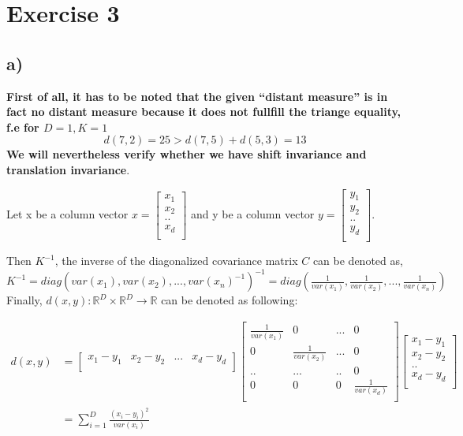 \section*{Exercise 3} %
\label{sec:exercise_3}

\subsection*{a)} %
\label{sub:a}

\textbf{First of all, it has to be noted that the given ``distant measure'' is in fact no distant measure because 
it does not fullfill the triange equality, f.e for $D=1, K=1$
\[
d(7,2) = 25 > d(7,5) + d(5,3) = 13
\]
We will nevertheless verify whether we have shift invariance and translation invariance}.

Let x be a column vector
$x = \begin{bmatrix}
x_{1}\\ 
x_{2}\\ 
..\\ 
x_{d} \\ 
\end{bmatrix}$
and y be a column vector
$y = \begin{bmatrix}
y_{1}\\ 
y_{2}\\ 
..\\ 
y_{d} \\ 
\end{bmatrix}$.

Then $K^{-1}$, the inverse of the diagonalized covariance matrix $C$ can be denoted as, 
$K^{-1}= diag(var(x_{1}), var(x_{2}), ..., var(x_{n})^{-1})^{-1} = diag(\frac{1}{var(x_{1})}, \frac{1}{var(x_{2})}, ..., \frac{1}{var(x_{n})})$ \\

Finally, $d(x,y): \mathbb{R}^D \times \mathbb{R}^D \to \mathbb{R}$ can be denoted as following: \newline 

\begin{align*}
d(x,y) &=\begin{bmatrix}
x_{1}-y_{1}	& x_{2}-y_{2} & ... & x_{d}-y_{d} \\ 
\end{bmatrix}
\begin{bmatrix}
\frac{1}{var(x_{1})} & 0 &  ...& 0 \\ 
0&  \frac{1}{var(x_{2})}& ... &0 \\ 
..& ... &  ..& 0\\ 
0& 0& 0 & \frac{1}{var(x_{d})} \\ 
\end{bmatrix}
\begin{bmatrix}
x_{1}-y_{1}\\ 
x_{2}-y_{2}\\ 
..\\ 
x_{d}-y_{d}\\
\end{bmatrix} \\
&= \sum_{i=1}^{D}\frac{(x_i - y_i)^2}{var(x_i)} \\
\end{align*}


